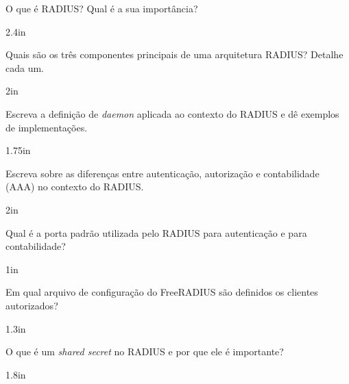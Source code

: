 \documentclass[12pt]{exam}
\begin{document}
	\begin{questions}

\question O que é RADIUS? Qual é a sua importância?

\begin{solutionbox}{2.4in}
\end{solutionbox}

\question Quais são os três componentes principais de uma arquitetura RADIUS? Detalhe cada um.

\begin{solutionbox}{2in}
\end{solutionbox}

\question Escreva a definição de \textit{daemon} aplicada ao contexto do RADIUS e dê exemplos de implementações.

\begin{solutionbox}{1.75in}
\end{solutionbox}

\question Escreva sobre as diferenças entre autenticação, autorização e contabilidade (AAA) no contexto do RADIUS.

\begin{solutionbox}{2in}
\end{solutionbox}
\question Qual é a porta padrão utilizada pelo RADIUS para autenticação e para contabilidade?

\begin{solutionbox}{1in}
\end{solutionbox}

\question Em qual arquivo de configuração do FreeRADIUS são definidos os clientes autorizados?

\begin{solutionbox}{1.3in}
\end{solutionbox}

\question O que é um \textit{shared secret} no RADIUS e por que ele é importante?

\begin{solutionbox}{1.8in}
\end{solutionbox}

\end{questions}
	
\end{document}
